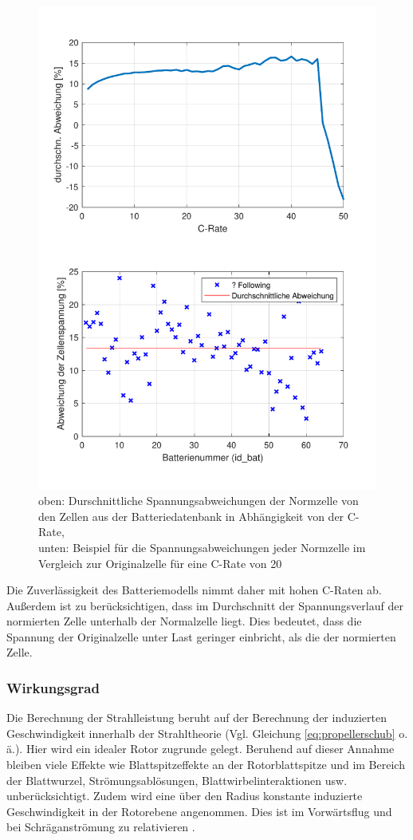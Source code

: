 \begin{figure}[H]
\centering
	\includegraphics{Diagramme/Abweichungen.pdf}
	\caption{oben: Durschnittliche Spannungsabweichungen der Normzelle von den Zellen aus der Batteriedatenbank in Abhängigkeit von der C-Rate, \\
	unten: Beispiel für die Spannungsabweichungen jeder Normzelle im Vergleich zur Originalzelle für eine C-Rate von 20}
	\label{abb:abweichungen}
\end{figure}
Die Zuverlässigkeit des Batteriemodells nimmt daher mit hohen C-Raten ab. Außerdem ist zu berücksichtigen, dass im Durchschnitt der Spannungsverlauf der normierten Zelle unterhalb der Normalzelle liegt. Dies bedeutet, dass die Spannung der Originalzelle unter Last geringer einbricht, als die der normierten Zelle.  

\subsubsection{Wirkungsgrad}
Die Berechnung der Strahlleistung beruht auf der Berechnung der induzierten Geschwindigkeit innerhalb der Strahltheorie (Vgl. Gleichung \ref{eq:propellerschub} o. ä.). Hier wird ein idealer Rotor zugrunde gelegt.
Beruhend auf dieser Annahme bleiben viele Effekte wie Blattspitzeffekte an der Rotorblattspitze und im Bereich der Blattwurzel, Strömungsablösungen, Blattwirbelinteraktionen usw. unberücksichtigt.  Zudem wird eine über den Radius konstante induzierte Geschwindigkeit in der Rotorebene angenommen. Dies ist im Vorwärtsflug und bei Schräganströmung zu relativieren \cite[S.226]{Wall.2015}.

